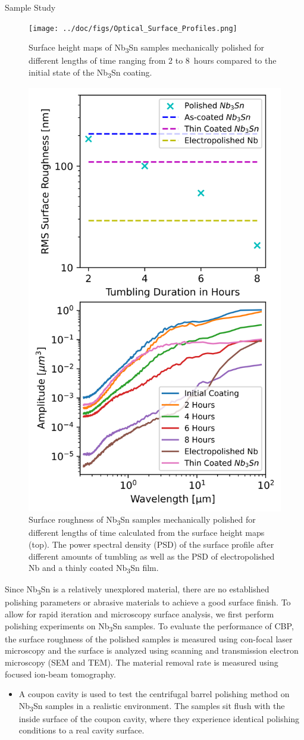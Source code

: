 \documentclass{beamer}
\begin{document}
\begin{frame}{}
\begin{columns}[t]
\begin{column}{0.32\linewidth}
\begin{block}{\label{sec:samplestudy}Sample Study}
                    \begin{figure}
                        \centering
                        \texttt{[image: ../doc/figs/Optical\_Surface\_Profiles.png]}
                        \caption[width=0.25\columnwidth]{\label{fig:opticalsurfaceprofiles}Surface height maps of Nb\textsubscript{3}Sn samples mechanically polished for different lengths of time ranging from 2 to 8~hours compared to the initial state of the Nb\textsubscript{3}Sn coating.}
                        \includegraphics[width=0.25\columnwidth]{../doc/figs/Surface_Roughness_Graph.png}
                        \caption[width=0.25\columnwidth]{\label{fig:surfaceroughnessgraph}Surface roughness of Nb\textsubscript{3}Sn samples mechanically polished for different lengths of time calculated from the surface height maps (top). The power spectral density (PSD) of the surface profile after different amounts of tumbling as well as the PSD of electropolished Nb and a thinly coated Nb\textsubscript{3}Sn film.}
                    \end{figure}
                    Since Nb\textsubscript{3}Sn is a relatively unexplored material, there are no established polishing parameters or abrasive materials to achieve a good surface finish. To allow for rapid iteration and microscopy surface analysis, we first perform polishing experiments on Nb\textsubscript{3}Sn samples. To evaluate the performance of CBP, the surface roughness of the polished samples is measured using con-focal laser microscopy and the surface is analyzed using scanning and transmission electron microscopy (SEM and TEM). The material removal rate is measured using focused ion-beam tomography.
                    \begin{itemize}                        
                        \item A coupon cavity is used to test the centrifugal barrel polishing method on Nb\textsubscript{3}Sn samples in a realistic environment. The samples sit flush with the inside surface of the coupon cavity, where they experience identical polishing conditions to a real cavity surface.

\end{itemize}
\end{block}
\end{column}
\end{columns}
\end{frame}
\end{document}
